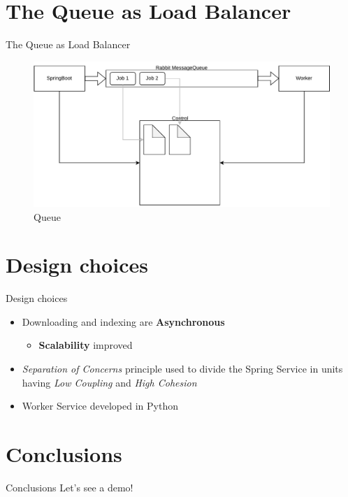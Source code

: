 \documentclass{beamer}
\begin{document}
\section{The Queue as Load Balancer}
\begin{frame}{The Queue as Load Balancer}
\begin{figure}[ht]
    \centering
    \includegraphics[width=1\linewidth] {queue.drawio}
    \caption{Queue}
    \label{fig:queue}
\end{figure}
\end{frame}

\section{Design choices}
\begin{frame}{Design choices}
\begin{itemize}
    \item Downloading and indexing are \textbf{Asynchronous}
    \begin{itemize}
        \item \textbf{Scalability} improved
    \end{itemize}
    \item \textit{Separation of Concerns} principle used to divide the
    Spring Service in units having \textit{Low Coupling} and \textit{High Cohesion}
    \item Worker Service developed in Python
\end{itemize}
\end{frame}

\section{Conclusions}
\begin{frame}{Conclusions}
\centering
Let's see a demo!
\end{frame}
\end{document}

